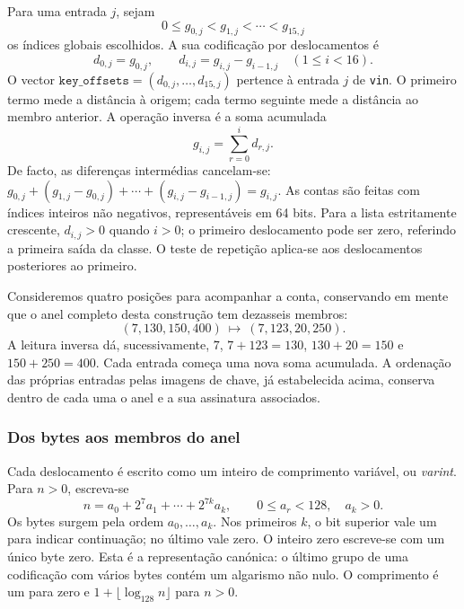 Para uma entrada \(j\), sejam
\[
 0\leq g_{0,j}<g_{1,j}<\cdots<g_{15,j}
\]
os índices globais escolhidos. A sua codificação por deslocamentos é
\begin{equation}
 d_{0,j}=g_{0,j},\qquad
 d_{i,j}=g_{i,j}-g_{i-1,j}\quad(1\leq i<16).
 \label{eq:relative-output-indices}
\end{equation}
O vector \(\texttt{key\_offsets}=(d_{0,j},\ldots,d_{15,j})\) pertence
à entrada \(j\) de \texttt{vin}. O primeiro termo mede a distância à
origem; cada termo seguinte mede a distância ao membro anterior.
A operação inversa é a soma acumulada
\begin{equation}
 g_{i,j}=\sum_{r=0}^{i}d_{r,j}.
 \label{eq:absolute-output-indices}
\end{equation}
De facto, as diferenças intermédias cancelam-se:
\(g_{0,j}+(g_{1,j}-g_{0,j})+\cdots+(g_{i,j}-g_{i-1,j})=g_{i,j}\).
As contas são feitas com índices inteiros não negativos, representáveis
em 64 bits. Para a lista estritamente crescente,
\(d_{i,j}>0\) quando \(i>0\); o primeiro deslocamento pode ser zero,
referindo a primeira saída da classe. O teste de repetição aplica-se
aos deslocamentos posteriores ao primeiro.

Consideremos quatro posições para acompanhar a conta, conservando em
mente que o anel completo desta construção tem dezasseis membros:
\[
 (7,130,150,400)\ \longmapsto\ (7,123,20,250).
\]
A leitura inversa dá, sucessivamente, \(7\), \(7+123=130\),
\(130+20=150\) e \(150+250=400\). Cada entrada começa uma nova soma
acumulada. A ordenação das próprias entradas pelas imagens de chave,
já estabelecida acima, conserva dentro de cada uma o anel e a sua
assinatura associados.

\subsubsection{Dos bytes aos membros do anel}
\label{subsec:ring-reconstruction}

%
Cada deslocamento é escrito como um inteiro de comprimento variável,
ou \emph{varint}. Para \(n>0\), escreva-se
\[
 n=a_0+2^7a_1+\cdots+2^{7k}a_k,
 \qquad 0\leq a_r<128,\quad a_k>0.
\]
Os bytes surgem pela ordem \(a_0,\ldots,a_k\). Nos primeiros \(k\),
o bit superior vale um para indicar continuação; no último vale zero.
O inteiro zero escreve-se com um único byte zero. Esta é a representação
canónica: o último grupo de uma codificação com vários bytes contém
um algarismo não nulo. O comprimento é um para zero e
\(1+\lfloor\log_{128}n\rfloor\) para \(n>0\).

